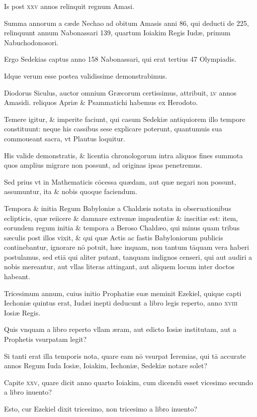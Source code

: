 \begin{parnumbers}
Is post \textsc{xxv} annos relinquit regnum Amasi.

Summa annorum a cæde Nechao ad obitum Amasis anni 86, qui
deducti de 225, relinquunt annum Nabonassari 139, quartum Ioiakim
Regis Iudæ, primum Nabuchodonosori.

Ergo Sedekias captus
anno 158 Nabonassari, qui erat tertius 47 Olympiadis.

Idque verum
esse postea validissime demonstrabimus.

Diodorus Siculus,
auctor omnium Græcorum certissimus, attribuit, \textsc{lv} annos Amasidi.
reliquos Apriæ \& Psammatichi habemus ex Herodoto.

Temere
igitur, \& imperite faciunt, qui casum Sedekiæ antiquiorem illo
tempore constituunt: neque his cassibus sese explicare poterunt,
quantumuis sua commoueant sacra, vt Plautus loquitur.

His valide
demonstratis, \& licentia chronologorum intra aliquos fines summota
quos amplius migrare non possunt, ad originas ipsas penetremus.

Sed prius vt in Mathematicis cōcessa quædam, aut quæ negari
non possunt, assumuntur, ita \& nobis quoque faciendum.

Tempora \& initia Regum Babyloniæ a Chaldæis notata in obseruationibus
eclipticis, quæ reiicere \& damnare extremæ impudentiæ \&
inscitiæ est: item, eorundem regum initia \& tempora a Beroso Chaldæo,
qui minus quam tribus sæculis post illos vixit, \& qui quæ Actis
ac fastis Babyloniorum publicis continebantur, ignorare nō potuit,
hæc inquam, non tantum tāquam vera haberi postulamus, sed etiā
qui aliter putant, tanquam indignos censeri, qui aut audiri a nobis
mereantur, aut vllas literas attingant, aut aliquem locum inter
doctos habeant.

Tricesimum annum, cuius initio Prophatiæ suæ
meminit Ezekiel, quique capti Iechoniæ quintus erat, Iudæi inepti
deducunt a libro legis reperto, anno \textsc{xviii} Iosiæ Regis.

Quis vnquam a libro reperto vllam æram, aut edicto Iosiæ institutam, aut a
Prophetis vsurpatam legit?

Si tanti erat illa temporis nota, quare
eam nō vsurpat Ieremias, qui tā accurate annos Regum Iuda Iosiæ,
Ioiakim, Iechoniæ, Sedekiæ notare solet?

Capite \textsc{xxv}, quare dicit
anno quarto Ioiakim, cum dicendū esset vicesimo secundo a libro
inuento?

Esto, cur Ezekiel dixit tricesimo, non tricesimo a libro inuento?


\end{parnumbers}
